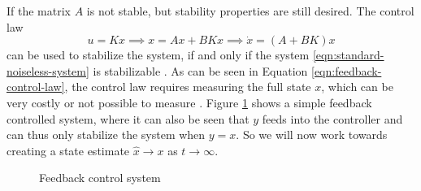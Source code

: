 If the matrix $A$ is not stable, but stability properties are still desired. The control law
\begin{equation}\label{eqn:feedback-control-law}
    u = Kx \implies x = Ax + BKx \implies \dot{x} = (A+BK)x
\end{equation}
can be used to stabilize the system, if and only if the system \eqref{eqn:standard-noiseless-system} is stabilizable \cite[Theorem 14.5]{Hespanha2018LinearTheory}. As can be seen in Equation \eqref{eqn:feedback-control-law}, the control law requires measuring the full state $x$, which can be very costly or not possible to measure \cite{Buchi2010StateExamples}. Figure \ref{fig:feedback-diagram} shows a simple feedback controlled system, where it can also be seen that $y$ feeds into the controller and can thus only stabilize the system when $y=x$. So we will now work towards creating a state estimate $\hat{x} \rightarrow x$ as $t \rightarrow \infty$.

\begin{figure}[H]
    \centering
    \caption{Feedback control system}
    \label{fig:feedback-diagram}
\end{figure}
 
